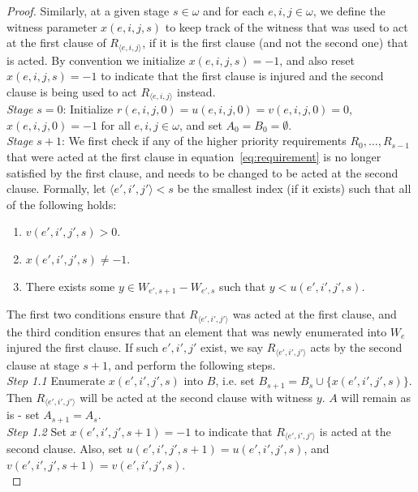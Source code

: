\documentclass{article}
\begin{document}
\begin{proof}
    Similarly, at a given stage $s\in\omega$ and for each $e,i,j\in\omega$,
    we define the witness parameter $x(e,i,j,s)$ to keep track of
    the witness that was used to act at the first clause of $R_{\langle
    e,i,j\rangle}$, if it is the first clause (and not the second one) that
    is acted. By convention we initialize $x(e,i,j,s)=-1$, and also
    reset $x(e,i,j,s)=-1$ to indicate that the first clause is injured and
    the second clause is being used to act $R_{\langle e,i,j\rangle}$
    instead. \\

    \textit{Stage} $s=0$: Initialize $r(e,i,j,0)=u(e,i,j,0)=v(e,i,j,0)=0$,
    $x(e,i,j,0)=-1$ for all $e,i,j\in\omega$, and set $A_0=B_0=\emptyset$.
    \\

    \textit{Stage} $s+1$: We first check if any of the higher priority
    requirements $R_0,\ldots,R_{s-1}$ that were acted at the first
    clause in equation~\eqref{eq:requirement} is no longer satisfied by the
    first clause, and needs to be changed to be acted at the second
    clause. Formally, let $\langle e',i',j'\rangle <s$ be the smallest
    index (if it exists) such that all of the following holds:

    \begin{enumerate}
      \item $v(e',i',j',s)>0$.
      \item $x(e',i',j',s)\neq-1$.
      \item There exists some $y\in W_{e',s+1}-W_{e',s}$ such that
        $y<u(e',i',j',s)$.
    \end{enumerate}

    The first two conditions ensure that $R_{\langle e',i',j'\rangle}$ was
    acted at the first clause, and the third condition ensures that an
    element that was newly enumerated into $W_e$ injured the first clause.
    If such $e',i',j'$ exist, we say $R_{\langle e',i',j'\rangle}$ acts by
    the second clause at stage $s+1$, and perform the following steps. \\

    \textit{Step 1.1} Enumerate $x(e',i',j',s)$ into $B$, i.e. set
    $B_{s+1}=B_{s}\cup\{x(e',i',j',s)\}$. Then $R_{\langle
    e',i',j'\rangle}$ will be acted at the second clause with witness
    $y$. $A$ will remain as is - set $A_{s+1}=A_s$. \\
    
    \textit{Step 1.2} Set $x(e',i',j',s+1)=-1$ to indicate that $R_{\langle
    e',i',j'\rangle}$ is acted at the second clause. Also, set
    $u(e',i',j',s+1)=u(e',i',j',s)$, and $v(e',i',j',s+1)=v(e',i',j',s)$.
    \\


\end{proof}
\end{document}
